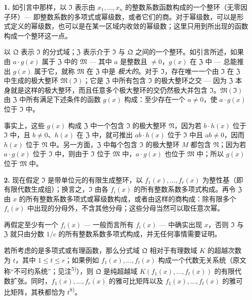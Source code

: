 \noindent\textbf{1.}
如引言中那样，以 $\mathfrak{I}$ 表示由 $x_1,\ldots,x_n$ 的整数系数函数构成的一个整环（无零因子环）--- 即整数系数的多项式或幂级数，或者它们的商。对于幂级数，可以是形式定义的幂级数，也可以是在某一区域内收敛的幂级数；这里只用到所出现的函数构成一个整环这一点。

以 $\mathfrak{Q}$ 表示 $\mathfrak{I}$ 的分式域；$\mathfrak{Z}$ 表示介于 $\mathfrak{I}$ 与 $\mathfrak{Q}$ 之间的一个整环。如引言所述，如果由 $a \cdot g(x)$ 属于 $\mathfrak{Z}$ 中的 $\mathfrak{M}$ --- 其中 $a$ 是整数且 $\neq 0$，$g(x)$ 在 $\mathfrak{Z}$ 中 --- 总能推出 $g(x)$ 属于它，就称 $\mathfrak{M}$ 在 $\mathfrak{Z}$ 中是 \textit{极大的}。对于 $\mathfrak{I}$，存在唯一一个由 $\mathfrak{I}$ 在 $\mathfrak{Z}$ 中生成的极大整环 $\mathfrak{M}(\mathfrak{I})$；它是 $\mathfrak{Z}$ 中所有包含 $\mathfrak{I}$ 的极大整环之交 --- 因为 $\mathfrak{Z}$ 本身就是这样的极大整环，而且任意多个极大整环的交仍然极大并包含 $\mathfrak{I}$。$\mathfrak{M}(\mathfrak{I})$ 由 $\mathfrak{Z}$ 中所有满足下述条件的函数 $g(x)$ 构成：至少存在一个 $a \neq 0$，使 $a \cdot g(x)$ 位于 $\mathfrak{I}$ 中。

事实上，这些 $g(x)$ 构成 $\mathfrak{Z}$ 中一个包含 $\mathfrak{I}$ 的极大整环 $\mathfrak{N}$，因为若 $b \cdot h(x)$ 位于 $\mathfrak{I}$ 中，且 $b \neq 0$、$h(x)$ 在 $\mathfrak{Z}$ 中，就可推出 $ab \cdot h(x)$ 位于 $\mathfrak{I}$ 中且 $ab \neq 0$，因而 $h(x)$ 位于 $\mathfrak{N}$ 中。另一方面，$\mathfrak{Z}$ 中每个包含 $\mathfrak{I}$ 的极大整环 $M$ 都包含 $\mathfrak{N}$；因为若 $a \cdot g(x)$ 位于 $\mathfrak{I}$ 中，则由于 $\mathfrak{I}$ 位于 $\mathfrak{M}$ 中，$a \cdot g(x)$ 也位于 $\mathfrak{M}$ 中；所以 $g(x)$ 位于 $\mathfrak{M}$ 中。

\medskip\noindent\textbf{2.}
现在假定 $\mathfrak{I}$ 是带单位元的有限生成整环，以 $f_1(x),\ldots,f_r(x)$ 为整性基（即有限代数生成组）；换言之，$\mathfrak{I}$ 由各 $f_i(x)$ 的所有整数系数多项式构成。再令 $\mathfrak{Z}$ 由 $x$ 的所有整数系数多项式或幂级数构成，或者由这样的商构成：除有限多个 $f_i(x)$ 中出现的分母外，不含其他分母；这些分母当然可以取任意次幂。

再假定至少有一个 $f_i(x)$ --- 一般而言所有 $f_i(x)$ --- 中确实出现 $x$，否则 $\mathfrak{I}$ 与 $\mathfrak{Z}$ 就只由分数 $1/c$ 的所有整数系数多项式构成，并无任何事情需要证明。

若所考虑的是多项式或有理函数，那么分式域 $\mathfrak{Q}$ 相对于有理数域 $K$ 的超越次数为 $t$，其中 $1 \leq t \leq r$；如果例如 $f_1(x),\ldots,f_t(x)$ 构成一个代数无关系统（原文称“不可约系统”；见注\textsuperscript{5)}），则 $\mathfrak{Q}$ 是纯超越域 $K(f_1(x),\ldots,f_t(x))$ 的有限代数扩张。同时，$f_1(x),\ldots,f_r(x)$ 的雅可比矩阵以及 $f_1(x),\ldots,f_t(x)$ 的雅可比矩阵，其秩都恰为 $t$\textsuperscript{8)}。

